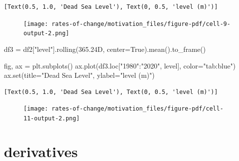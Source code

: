 \documentclass[
  letterpaper,
  DIV=11,
  numbers=noendperiod,
  oneside]{scrreprt}
\newenvironment{Shaded}{\begin{snugshade}}{\end{snugshade}}
\newcommand{\BuiltInTok}[1]{\textcolor[rgb]{0.00,0.23,0.31}{#1}}
\newcommand{\NormalTok}[1]{\textcolor[rgb]{0.00,0.23,0.31}{#1}}
\newcommand{\OperatorTok}[1]{\textcolor[rgb]{0.37,0.37,0.37}{#1}}
\newcommand{\StringTok}[1]{\textcolor[rgb]{0.13,0.47,0.30}{#1}}
\newcommand{\VariableTok}[1]{\textcolor[rgb]{0.07,0.07,0.07}{#1}}
\begin{document}
\begin{verbatim}
[Text(0.5, 1.0, 'Dead Sea Level'), Text(0, 0.5, 'level (m)')]
\end{verbatim}

\begin{figure}[H]

{\centering \texttt{[image: rates-of-change/motivation\_files/figure-pdf/cell-9-output-2.png]}

}

\end{figure}

\begin{Shaded}
\begin{Highlighting}[]
\NormalTok{df3 }\OperatorTok{=}\NormalTok{ df2[}\StringTok{"level"}\NormalTok{].rolling(}\StringTok{\textquotesingle{}365.24D\textquotesingle{}}\NormalTok{, center}\OperatorTok{=}\VariableTok{True}\NormalTok{).mean().to\_frame()}
\end{Highlighting}
\end{Shaded}

\begin{Shaded}
\begin{Highlighting}[]
\NormalTok{fig, ax }\OperatorTok{=}\NormalTok{ plt.subplots()}
\NormalTok{ax.plot(df3.loc[}\StringTok{"1980"}\NormalTok{:}\StringTok{"2020"}\NormalTok{, }\StringTok{\textquotesingle{}level\textquotesingle{}}\NormalTok{], color}\OperatorTok{=}\StringTok{"tab:blue"}\NormalTok{)}
\NormalTok{ax.}\BuiltInTok{set}\NormalTok{(title}\OperatorTok{=}\StringTok{"Dead Sea Level"}\NormalTok{,}
\NormalTok{       ylabel}\OperatorTok{=}\StringTok{"level (m)"}\NormalTok{)}
\end{Highlighting}
\end{Shaded}

\begin{verbatim}
[Text(0.5, 1.0, 'Dead Sea Level'), Text(0, 0.5, 'level (m)')]
\end{verbatim}

\begin{figure}[H]

{\centering \texttt{[image: rates-of-change/motivation\_files/figure-pdf/cell-11-output-2.png]}

}

\end{figure}

\hypertarget{derivatives}{%
\chapter{derivatives}\label{derivatives}}
\end{document}
